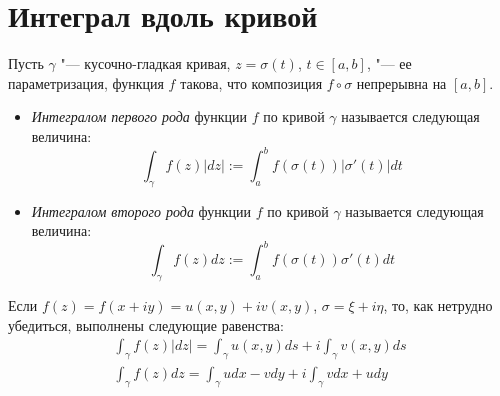 \section{Интеграл вдоль кривой}

\begin{definition}
	Пусть $\gamma$ "--- кусочно-гладкая кривая, $z = \sigma(t)$, $t \in [a, b]$, "--- ее параметризация, функция $f$ такова, что композиция $f\circ\sigma$ непрерывна на $[a, b]$.
	\begin{itemize}
		\item \textit{Интегралом первого рода} функции $f$ по кривой $\gamma$ называется следующая величина:
		\[\int_{\gamma}f(z)|dz| := \int_a^bf(\sigma(t))|\sigma'(t)|dt\]
		\item \textit{Интегралом второго рода} функции $f$ по кривой $\gamma$ называется следующая величина:
		\[\int_{\gamma}f(z)dz := \int_a^bf(\sigma(t))\sigma'(t)dt\]
	\end{itemize}
\end{definition}

\begin{note}
	Если $f(z) = f(x + iy) = u(x, y) + iv(x, y)$, $\sigma = \xi + i\eta$, то, как нетрудно убедиться, выполнены следующие равенства:
	\begin{gather*}
		\int_{\gamma}f(z)|dz| = \int_\gamma u(x, y)ds + i\int_\gamma v(x, y)ds
		\\
		\int_{\gamma}f(z)dz = \int_\gamma udx - vdy + i\int_\gamma vdx + udy
	\end{gather*}
\end{note}

